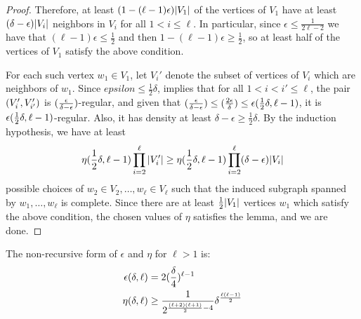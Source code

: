 \begin{lemma}
\begin{proof}
            Therefore, at least $(1 - (\ell -1) \epsilon) | V_1 |$ of the vertices of $V_1$ have at least
            $(\delta - \epsilon) | V_i |$ neighbors in $V_i$ for all $1 < i \leq \ell$.
            In particular, since $\epsilon \leq \frac{1}{2\ell - 2}$ we have that $(\ell - 1) \epsilon \leq \frac{1}{2}$
            and then $1 - (\ell - 1) \epsilon \geq \frac{1}{2}$, so at least half of the vertices of $V_1$ satisfy the
            above condition.

            For each such vertex $w_1 \in V_1$, let $V_i'$ denote the subset of vertices of $V_i$ which are neighbors
            of $w_1$.
            Since $epsilon \leq \frac{1}{2}\delta$,  implies that for all
            $1 < i < i' \leq \ell$, the pair $( V_i', V_{i'}' )$ is $( \frac{\epsilon}{\delta-\epsilon} )$-regular,
            and given that $( \frac{\epsilon}{\delta-\epsilon} ) \leq ( \frac{2\epsilon}{\delta} ) \leq \epsilon( \frac{1}{2}\delta, \ell-1 )$,
            it is $\epsilon( \frac{1}{2}\delta, \ell-1 )$-regular.
            Also, it has density at least $\delta - \epsilon \geq \frac{1}{2} \delta$.
            By the induction hypothesis, we have at least
            \[
                \eta ( \frac{1}{2}\delta, \ell-1 ) \prod_{i=2}^\ell | V_i' |
                    \geq \eta ( \frac{1}{2}\delta, \ell-1 ) \prod_{i=2}^\ell ( \delta - \epsilon ) | V_i |
            \]
            possible choices of $w_2 \in V_2, \dots, w_\ell \in V_\ell$ such that the induced subgraph spanned by
            $w_1, \dots, w_\ell$ is complete.
            Since there are at least $\frac{1}{2} | V_1 |$ vertices $w_1$ which satisfy the above condition,
            the chosen values of $\eta$ satisfies the lemma, and we are done.
        \end{proof}
    \end{lemma}

    \begin{remark}
        The non-recursive form of $\epsilon$ and $\eta$ for $\ell > 1$ is:
        \begin{align*}
            \epsilon(\delta, \ell) & = 2 ( \frac{\delta}{4} )^{\ell-1} \\
            \eta(\delta, \ell) & \geq \frac{1}{2^{\frac{(\ell+2)(\ell+1)}{2}-4}} \delta^{\frac{\ell(\ell-1)}{2}}
        \end{align*}
    \end{remark}

